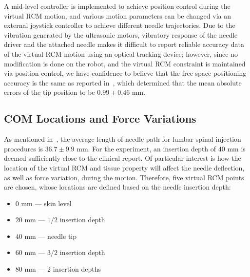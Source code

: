 
A mid-level controller is implemented to achieve position control during the virtual RCM motion, and various motion parameters can be changed via an external joystick controller to achieve different needle trajectories. Due to the vibration generated by the ultrasonic motors, vibratory response of the needle driver and the attached needle makes it difficult to report reliable accuracy data of the virtual RCM motion using an optical tracking device; however, since no modification is done on the robot, and the virtual RCM constraint is maintained via position control, we have confidence to believe that the free space positioning accuracy is the same as reported in~\parencite{liFullyActuatedBodyMounted2020a}, which determined that the mean absolute errors of the tip position to be $0.99 \pm 0.46$ mm.

\subsection{COM Locations and Force Variations} 
\label{sec:chap-2-com-and-force}
As mentioned in~\parencite{fritzAugmentedRealityVisualization2012}, the average length of needle path for lumbar spinal injection procedures is $36.7\pm9.9$ mm. For the experiment, an insertion depth of $40$ mm is deemed sufficiently close to the clinical report. Of particular interest is how the location of the virtual RCM and tissue property will affect the needle deflection, as well as force variation, during the motion. Therefore, five virtual RCM points are chosen, whose locations are defined based on the needle insertion depth:

\begin{itemize}
  \item $0$ mm --- skin level
  \item $20$ mm --- $1/2$ insertion depth
  \item $40$ mm --- needle tip
  \item $60$ mm --- $3/2$ insertion depth
  \item $80$ mm --- 2 insertion depths
\end{itemize}

